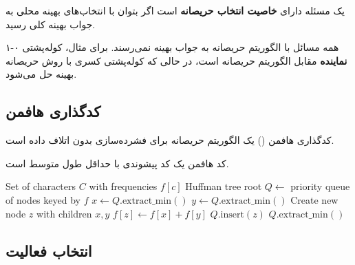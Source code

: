\documentclass{matinbook}
\begin{document}
    \begin{definition}
        یک مسئله دارای \textbf{خاصیت انتخاب حریصانه} است
        اگر بتوان با انتخاب‌های بهینه محلی
        به جواب بهینه کلی رسید.
        \label{def:greedy-choice}
    \end{definition}
    
    \begin{remark}
        همه مسائل با الگوریتم حریصانه
        به جواب بهینه نمی‌رسند.
        برای مثال، کوله‌پشتی ۰-۱ \textbf{نماینده}
        مقابل الگوریتم حریصانه است،
        در حالی که کوله‌پشتی کسری با روش حریصانه
        بهینه حل می‌شود.
        \label{rem:greedy-limitation}
    \end{remark}
    
    \subsection{کدگذاری هافمن}
    
    کدگذاری هافمن
    () یک الگوریتم حریصانه
    برای فشرده‌سازی بدون اتلاف داده است.
    
    \begin{theorem}
        کد هافمن یک کد پیشوندی با حداقل
        طول متوسط است.
        \label{thm:huffman-optimal}
    \end{theorem}
    
    \begin{latin}
        \begin{algorithm}
            \begin{algorithmic}[1]
                \Require Set of characters $C$ with frequencies $f[c]$
                \Ensure Huffman tree root
                \State $Q \gets$ priority queue of nodes keyed by $f$
                \State $x \gets Q.\text{extract\_min}()$
                \State $y \gets Q.\text{extract\_min}()$
                \State Create new node $z$ with children $x, y$
                \State $f[z] \gets f[x] + f[y]$
                \State $Q.\text{insert}(z)$
                \EndFor
                \State \Return $Q.\text{extract\_min}()$
            \end{algorithmic}
        \end{algorithm}
    \end{latin}
    
    \subsection{انتخاب فعالیت}
    
\end{document}
